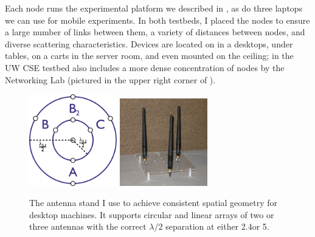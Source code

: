 Each node runs the experimental platform we described in , as do three laptops we can use for mobile experiments. In both testbeds, I placed the nodes to ensure a large number of links between them, a variety of distances between nodes, and diverse scattering characteristics. Devices are located on in a desktops, under tables, on a carts in the server room, and even mounted on the ceiling; in the UW CSE testbed also includes a more dense concentration of nodes by the Networking Lab (pictured in the upper right corner of ).

\begin{figure}[h]
	\centering
	\includegraphics[width=1.5in]{figures/rpsma_dual_632_single_lines.pdf}%
	\hspace{1in}
	\includegraphics[height=1.5in,width=1.5in]{figures/antennas.png}
	\caption{\label{fig:antenna_stand}The antenna stand I use to achieve consistent spatial geometry for desktop machines. It supports circular and linear arrays of two or three antennas with the correct $\lambda/2$ separation at either 2.4\GHz or 5\GHz.}
\end{figure}
